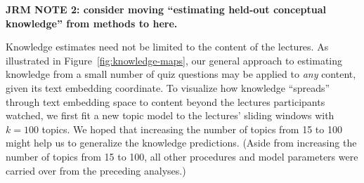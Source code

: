 \documentclass[10pt]{article}
\begin{document}
\textbf{JRM NOTE 2: consider moving ``estimating held-out conceptual
knowledge'' from methods to here.}




Knowledge estimates need not be limited to the content of the lectures. As
illustrated in Figure~\ref{fig:knowledge-maps}, our general approach to
estimating knowledge from a small number of quiz questions may be applied to
\textit{any} content, given its text embedding coordinate. To visualize how
knowledge ``spreads'' through text embedding space to content beyond the
lectures participants watched, we first fit a new topic model to the lectures'
sliding windows with $k = 100$ topics. We hoped that increasing the number of
topics from 15 to 100 might help us to generalize the knowledge predictions.
(Aside from increasing the number of topics from 15 to 100, all other
procedures and model parameters were carried over from the preceding analyses.)
\end{document}
